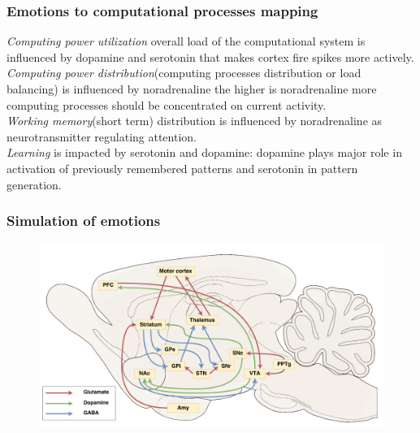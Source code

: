 \documentclass[12pt, aspectratio=169]{beamer}
\begin{document}
\begin{frame}
  \frametitle{Emotions to computational processes mapping}

\emph{Computing power utilization} overall load of the computational system is influenced by dopamine and serotonin that makes cortex fire spikes more actively.\\
\emph{Computing power distribution}(computing processes distribution or load balancing) is influenced by noradrenaline the higher is noradrenaline more computing processes should be concentrated on current activity.\\
\emph{Working memory}(short term) distribution is influenced by noradrenaline as neurotransmitter regulating attention.\\
\emph{Learning} is impacted by serotonin and dopamine: dopamine plays major role in activation of previously remembered patterns and serotonin in pattern generation.\\
\end{frame}


\begin{frame}
\frametitle{Simulation of emotions}
\begin{figure}
\includegraphics[width=0.99\linewidth]{rat_da}
\end{figure}
\end{frame}

\end{document}
